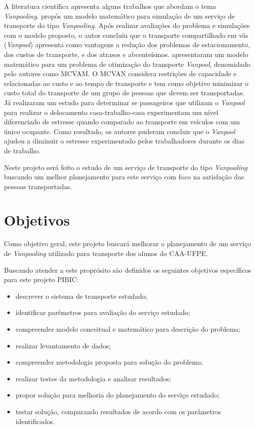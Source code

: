 \documentclass[11pt,a4paper]{article}
\begin{document}
A literatura científica apresenta alguns trabalhos que abordam o tema \emph{Vanpooling}. \cite{Nassar1986} propôs um modelo matemático para simulação de um serviço de transporte do tipo \emph{Vanpooling}. Após realizar avaliações do problema e simulações com o modelo proposto, o autor concluiu que o transporte compartilhado em vãs (\emph{Vanpool}) apresenta como vantagens a redução dos problemas de estacionamento, dos custos de transporte, e dos atrasos e abcenteísmos. \cite{KaanOlinick2013} apresentaram um modelo matemático para um problema de otimização do transporte \emph{Vanpool}, denomidado pelo autores como MCVAM. O MCVAN considera restrições de capacidade e relacionadas ao custo e ao tempo de transporte e tem como objetivo minimizar o custo total do transporte de um grupo de pessoas que devem ser transportadas.  Já \cite{DitmoreDeming2018} realizaram um estudo para determinar se passageiros que utilizam o \emph{Vanpool} para realizar o delocamento casa-trabalho-casa experimentam um nível diferenciado de estresse quando comparado ao transporte em veículos com um único ocupante. Como resultado, os autores puderam concluir que o \emph{Vanpool} ajudou a diminuir o estresse experimentado pelos trabalhadores durante os dias de trabalho.

Neste projeto será feito o estudo de um serviço de transporte do tipo \emph{Vanpooling} buscando um melhor planejamento para este serviço com foco na satisfação das pessoas transportadas.

\section{Objetivos}

Como objetivo geral, este projeto buscará melhorar o planejamento de um serviço de \emph{Vanpooling} utilizado para transporte dos alunos do CAA-UFPE.

Buscando atender a este proprósito são definidos os seguintes objetivos específicos para este projeto PIBIC:

\begin{itemize}
\item descrever o sistema de transporte estudado;
\item identificar parêmetros para avaliação do serviço estudado;
\item compreender modelo conceitual e matemático para descrição do problema;
\item realizar levantamento de dados;
\item compreender metodologia proposta para solução do problema;
\item realizar testes da metodologia e analisar resultados;
\item propor solução para melhoria do planejamento do serviço estudado;
\item testar solução, comparando resultados de acordo com os parâmetros identificados.
\end{itemize}
\end{document}
